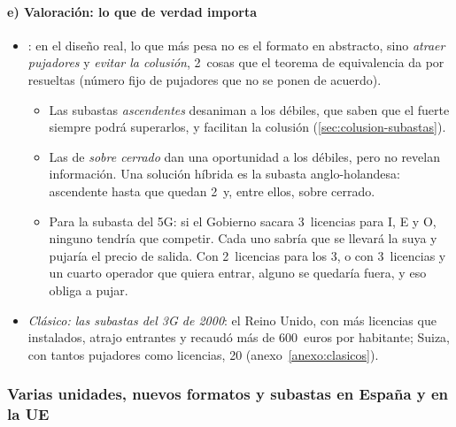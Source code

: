 \documentclass[11pt]{article}
\begin{document}
\paragraph{e) Valoración: lo que de verdad importa}

\begin{itemize}
\item \textcite{Klemperer2002WhatReallyMatters}: en el diseño real, lo que más pesa no es el formato en abstracto, sino \emph{atraer pujadores} y \emph{evitar la colusión}, 2~cosas que el teorema de equivalencia da por resueltas (número fijo de pujadores que no se ponen de acuerdo).
  \begin{itemize}
  \item Las subastas \emph{ascendentes} desaniman a los débiles, que saben que el fuerte siempre podrá superarlos, y facilitan la colusión (\ref{sec:colusion-subastas}).
  \item Las de \emph{sobre cerrado} dan una oportunidad a los débiles, pero no revelan información. Una solución híbrida es la subasta anglo-holandesa: ascendente hasta que quedan 2~y, entre ellos, sobre cerrado.
  \item Para la subasta del 5G: si el Gobierno sacara 3~licencias para \textup{I}, E y O, ninguno tendría que competir. Cada uno sabría que se llevará la suya y pujaría el precio de salida. Con 2~licencias para los 3, o con 3~licencias y un cuarto operador que quiera entrar, alguno se quedaría fuera, y eso obliga a pujar.
  \end{itemize}
\item \emph{Clásico: las subastas del 3G de 2000}\nocite{BinmoreKlemperer2002Biggest}: el Reino Unido, con más licencias que instalados, atrajo entrantes y recaudó más de 600~euros por habitante; Suiza, con tantos pujadores como licencias, 20 (anexo~\ref{anexo:clasicos}).
\end{itemize}

\subsubsection{Varias unidades, nuevos formatos y subastas en España y en la UE}\label{sec:multiunidad}
\end{document}
